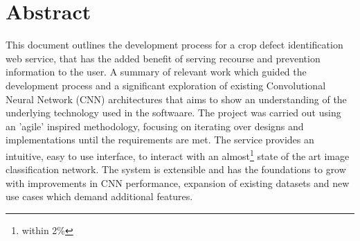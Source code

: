 \titleformat{\chapter}[hang]
    {\normalfont\Huge\bfseries}{\chaptertitlename\ \thechapter\ -\ }{0pt}{\Huge}
\titlespacing*{\chapter}{0pt}{0pt}{20pt}



\chapter*{Abstract}
\thispagestyle{fancy} %
  This document outlines the development process for a crop defect identification web service, that has the added benefit of serving recourse and prevention information to the user. A summary of relevant work which guided the development process and a significant exploration of existing Convolutional Neural Network (CNN) architectures that aims to show an understanding of the underlying technology used in the softwaare. The project was carried out using an 'agile' inspired methodology, focusing on iterating over designs and implementations until the requirements are met.
  The service provides an intuitive, easy to use interface, to interact with an almost\footnote[1]{within 2\%} state of the art image classification network. The system is extensible and has the foundations to grow with improvements in CNN performance, expansion of existing datasets and new use cases which demand additional features.
%
%
%
%
%
%

